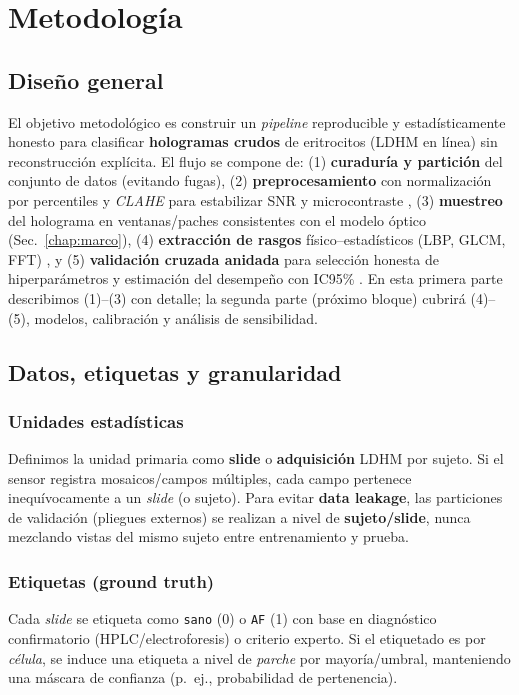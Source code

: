 \chapter{Metodología}
\label{chap:metodologia}

\section{Diseño general}
El objetivo metodológico es construir un \emph{pipeline} reproducible y estadísticamente honesto para clasificar \textbf{hologramas crudos} de eritrocitos (LDHM en línea) sin reconstrucción explícita. El flujo se compone de: (1) \textbf{curaduría y partición} del conjunto de datos (evitando fugas), (2) \textbf{preprocesamiento} con normalización por percentiles y \emph{CLAHE} para estabilizar SNR y microcontraste \cite{Zhou2019MedImageContrast}, (3) \textbf{muestreo} del holograma en ventanas/paches consistentes con el modelo óptico (Sec.~\ref{chap:marco}), (4) \textbf{extracción de rasgos} físico–estadísticos (LBP, GLCM, FFT) \cite{Kiani2022TextureSurvey,Chen2022Photonics}, y (5) \textbf{validación cruzada anidada} para selección honesta de hiperparámetros y estimación del desempeño con IC95\% \cite{Tsamardinos2022Patterns}. En esta primera parte describimos (1)--(3) con detalle; la segunda parte (próximo bloque) cubrirá (4)--(5), modelos, calibración y análisis de sensibilidad.

\section{Datos, etiquetas y granularidad}
\subsection{Unidades estadísticas}
Definimos la unidad primaria como \textbf{slide} o \textbf{adquisición} LDHM por sujeto. Si el sensor registra mosaicos/campos múltiples, cada campo pertenece inequívocamente a un \emph{slide} (o sujeto). Para evitar \textbf{data leakage}, las particiones de validación (pliegues externos) se realizan a nivel de \textbf{sujeto/slide}, nunca mezclando vistas del mismo sujeto entre entrenamiento y prueba.

\subsection{Etiquetas (ground truth)}
Cada \emph{slide} se etiqueta como \texttt{sano} (0) o \texttt{AF} (1) con base en diagnóstico confirmatorio (HPLC/electroforesis) o criterio experto. Si el etiquetado es por \emph{célula}, se induce una etiqueta a nivel de \emph{parche} por mayoría/umbral, manteniendo una máscara de confianza (p.~ej., probabilidad de pertenencia).

